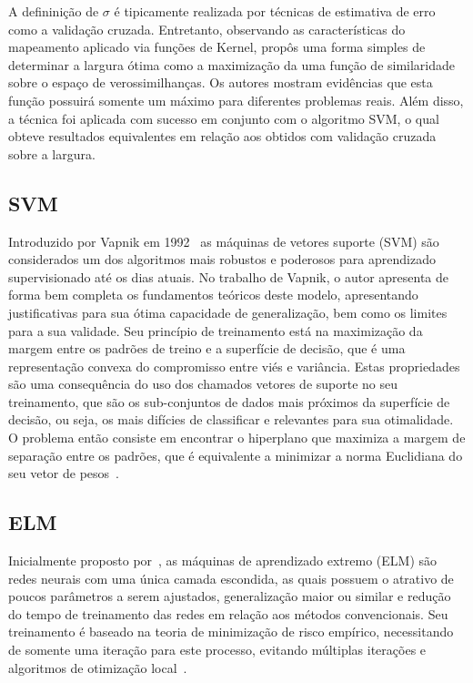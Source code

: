 \documentclass[conference]{IEEEtran}
\begin{document}
	A defininição de $\sigma$ é tipicamente realizada por técnicas de estimativa de erro como a validação cruzada. Entretanto, observando as características do mapeamento aplicado via funções de Kernel, \cite{menezes2019width} propôs uma forma simples de determinar a largura ótima como a maximização da uma função de similaridade sobre o espaço de verossimilhanças. Os autores mostram evidências que esta função possuirá somente um máximo para diferentes problemas reais. Além disso, a técnica foi aplicada com sucesso em conjunto com o algoritmo SVM, o qual obteve resultados equivalentes em relação aos obtidos com validação cruzada sobre a largura.
	
	\subsection{SVM}
	Introduzido por Vapnik em 1992~\cite{boser1992training} as máquinas de vetores suporte (SVM) são considerados um dos algoritmos mais robustos e poderosos para aprendizado supervisionado até os dias atuais. No trabalho de Vapnik, o autor apresenta de forma bem completa os fundamentos teóricos deste modelo, apresentando justificativas para sua ótima capacidade de generalização, bem como os limites para a sua validade. Seu princípio de treinamento está na maximização da margem entre os padrões de treino e a superfície de decisão, que é uma representação convexa do compromisso entre viés e variância.
	Estas propriedades são uma consequência do uso dos chamados vetores de suporte no seu treinamento, que são os sub-conjuntos de dados mais próximos da superfície de decisão, ou seja, os mais difícies de classificar e relevantes para sua otimalidade. O problema então consiste em encontrar o hiperplano que maximiza a margem de separação entre os padrões, que é equivalente a minimizar a norma Euclidiana do seu vetor de pesos~\cite{haykin2007neural}. 
	
	\subsection{ELM}	
	Inicialmente proposto por~\cite{huang2004extreme}, as máquinas de aprendizado extremo (ELM) são redes neurais com uma única camada escondida, as quais possuem o atrativo de poucos parâmetros a serem ajustados, generalização maior ou similar e redução do tempo de treinamento das redes em relação aos métodos convencionais. Seu treinamento é baseado na teoria de minimização de risco empírico, necessitando de somente uma iteração para este processo, evitando múltiplas iterações e algoritmos de otimização local~\cite{ding2015extreme}. 
	
\end{document}
